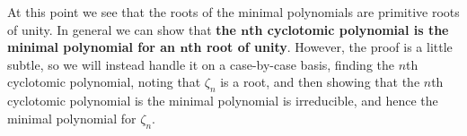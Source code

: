 \documentclass{ximera}
\begin{document}
At this point we see that the roots of the minimal polynomials are
primitive roots of unity. In general we can show that \textbf{the
  $\boldsymbol{n}$th cyclotomic polynomial is the minimal polynomial
  for an $\boldsymbol{n}$th root of unity}. However, the proof is a
little subtle, so we will instead handle it on a case-by-case basis,
finding the $n$th cyclotomic polynomial, noting that $\zeta_n$ is a
root, and then showing that the $n$th cyclotomic polynomial is the
minimal polynomial is irreducible, and hence the minimal polynomial
for $\zeta_n$.








  
\end{document}

